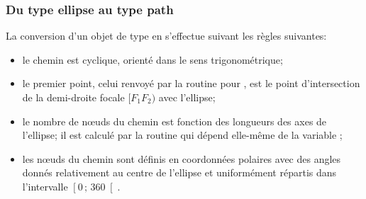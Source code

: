 \documentclass[pdftex]{article}
\begin{document}
\subsubsection{\texorpdfstring{Du type \og{}ellipse\fg{} au type
    \og{}path\fg{}}{Du type «ellipse» au type «path»}}
La conversion d'un objet de type  en 
s'effectue suivant les règles suivantes:
\begin{itemize}
\item le chemin est cyclique, orienté dans le sens trigonométrique;
\item le premier point, celui renvoyé par la
  routine  pour , est le
  point d'intersection de la demi-droite focale $[F_{1}F_{2})$ avec l'ellipse;
\item le nombre de n\oe{}uds du chemin est fonction des longueurs des
  axes de l'ellipse; il est calculé par la routine
  qui dépend elle-même de la variable
  ;
\item les n\oe{}uds du chemin sont définis en coordonnées polaires
  avec des angles donnés relativement au centre de l'ellipse et
  uniformément répartis dans l'intervalle $\left[0\,;\,360\right[$.
\end{itemize}
\end{document}
